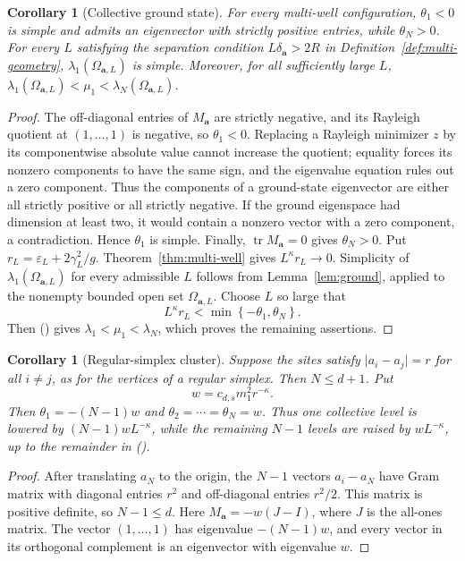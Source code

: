 \documentclass[twoside,10pt]{article}
\numberwithin{equation}{section}
\theoremstyle{slbody}
\newtheorem{corollary}[theorem]{Corollary}
\theoremstyle{definition}
\newcommand{\abs}[1]{\lvert #1\rvert}
\renewcommand{\eqref}[1]{%
  \textup{{\normalfont(\oldstylenums{\ref{#1}}}\normalfont)}}
\begin{document}
\begin{corollary}[Collective ground state]\label{cor:collective-ground}
For every multi-well configuration, $\theta_1<0$ is simple and admits an
eigenvector with strictly positive entries, while $\theta_N>0$.
For every $L$ satisfying the separation condition
$L\delta_{\mathbf a}>2R$ in Definition~\ref{def:multi-geometry},
$\lambda_1(\Omega_{\mathbf a,L})$ is simple.  Moreover, for all sufficiently
large $L$,
$\lambda_1(\Omega_{\mathbf a,L})<\mu_1<\lambda_N(\Omega_{\mathbf a,L})$.
\end{corollary}

\begin{proof}
The off-diagonal entries of $M_{\mathbf a}$ are strictly negative, and its
Rayleigh quotient at $(1,\dots,1)$ is negative, so $\theta_1<0$.  Replacing a
Rayleigh minimizer $z$ by its componentwise absolute value cannot increase
the quotient; equality forces its nonzero components to have the same sign,
and the eigenvalue equation rules out a zero component.  Thus the components
of a ground-state eigenvector are either all strictly positive or all strictly
negative.  If the ground eigenspace had dimension at
least two, it would contain a nonzero vector with a zero component, a
contradiction.  Hence $\theta_1$ is simple.  Finally,
$\operatorname{tr}M_{\mathbf a}=0$ gives $\theta_N>0$.  Put
$r_L=\varepsilon_L+2\gamma_L^2/g$.  Theorem~\ref{thm:multi-well} gives
$L^\kappa r_L\to0$.  Simplicity of
$\lambda_1(\Omega_{\mathbf a,L})$ for every admissible $L$ follows from
Lemma~\ref{lem:ground}, applied to the nonempty bounded open set
$\Omega_{\mathbf a,L}$.  Choose $L$ so large that
\[
 L^\kappa r_L
 <\min\left\{-\theta_1,\theta_N\right\}.
\]
Then \eqref{eq:multi-eigenvalue-bound} gives
$\lambda_1<\mu_1<\lambda_N$, which proves the remaining assertions.
\end{proof}

\begin{corollary}[Regular-simplex cluster]\label{cor:simplex}
Suppose the sites satisfy $\abs{a_i-a_j}=r$ for all $i\ne j$, as for the
vertices of a regular simplex.  Then $N\leq d+1$.  Put
\[
 w=c_{d,s}m_1^2r^{-\kappa}.
\]
Then $\theta_1=-(N-1)w$ and
$\theta_2=\cdots=\theta_N=w$.  Thus one collective level is lowered by
$(N-1)wL^{-\kappa}$, while the remaining $N-1$ levels are raised by
$wL^{-\kappa}$, up to the remainder in
\eqref{eq:multi-eigenvalue-bound}.
\end{corollary}

\begin{proof}
After translating $a_N$ to the origin, the $N-1$ vectors
$a_i-a_N$ have Gram matrix with diagonal entries $r^2$ and off-diagonal
entries $r^2/2$.  This matrix is positive definite, so $N-1\leq d$.
Here $M_{\mathbf a}=-w(J-I)$, where $J$ is the all-ones matrix.  The vector
$(1,\dots,1)$ has eigenvalue $-(N-1)w$, and every vector in its orthogonal
complement is an eigenvector with eigenvalue $w$.
\end{proof}
\end{document}
